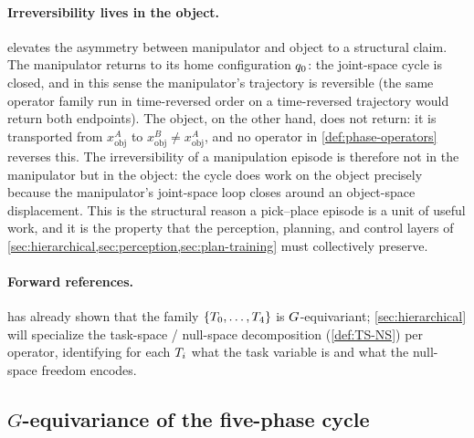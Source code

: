 \paragraph{Irreversibility lives in the object.}
 elevates the asymmetry between manipulator
and object to a structural claim. The manipulator returns to
its home configuration $q_{0}$: the joint-space cycle is
closed, and in this sense the manipulator's trajectory is
reversible (the same operator family run in time-reversed order
on a time-reversed trajectory would return both endpoints). The
object, on the other hand, does not return: it is transported
from $x_{\mathrm{obj}}^{A}$ to $x_{\mathrm{obj}}^{B} \neq
x_{\mathrm{obj}}^{A}$, and no operator in
\cref{def:phase-operators} reverses this. The irreversibility
of a manipulation episode is therefore not in the manipulator
but in the object: the cycle does work on the object precisely
because the manipulator's joint-space loop closes around an
object-space displacement. This is the structural reason a
pick--place episode is a unit of useful work, and it is the
property that the perception, planning, and control layers of
\cref{sec:hierarchical,sec:perception,sec:plan-training}
must collectively preserve.

\paragraph{Forward references.}
 has already shown that the family
$\{T_{0}, \ldots, T_{4}\}$ is $G$-equivariant;
\cref{sec:hierarchical} will specialize the task-space /
null-space decomposition (\cref{def:TS-NS}) per operator,
identifying for each $T_{i}$ what the task variable is
and what the null-space freedom encodes.

\subsection{$G$-equivariance of the five-phase cycle}
\label{sec:G-equivariance}

